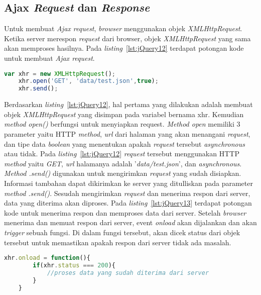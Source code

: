 \subsection{Ajax \textit{Request} dan \textit{Response}}
Untuk membuat \textit{Ajax request}, \textit{browser} menggunakan objek \textit{XMLHttpRequest}. Ketika server merespon \textit{request} dari browser, objek \textit{XMLHttpRequest} yang sama akan memproses hasilnya. Pada \textit{listing}~\ref{lst:jQuery12} terdapat potongan kode untuk membuat \textit{Ajax request}. 

\begin{lstlisting}[language=Javascript, caption=Membuat \textit{Ajax request} , label={lst:jQuery12}]
	var xhr = new XMLHttpRequest();
	xhr.open('GET', 'data/test.json',true);
	xhr.send();
\end{lstlisting}

Berdasarkan \textit{listing}~\ref{lst:jQuery12}, hal pertama yang dilakukan adalah membuat objek \textit{XMLHttpRequest} yang disimpan pada variabel bernama xhr. Kemudian \textit{method open()} berfungsi untuk menyiapkan request. \textit{Method open} memiliki 3 parameter yaitu HTTP \textit{method}, \textit{url} dari halaman yang akan menangani \textit{request}, dan tipe data \textit{boolean} yang menentukan apakah \textit{request} tersebut \textit{asynchronous} atau tidak. Pada \textit{listing}~\ref{lst:jQuery12} \textit{request} tersebut menggunakan HTTP \textit{method} yaitu \textit{GET}, \textit{url} halamanya adalah '\textit{data/test.json}', dan \textit{asynchronous}. \textit{Method .send()} digunakan untuk mengirimkan \textit{request} yang sudah disiapkan. Informasi tambahan dapat dikirimkan ke server yang ditulliskan pada parameter \textit{method .send()}. Sesudah mengirimkan \textit{request} dan menerima respon dari server, data yang diterima akan diproses. Pada \textit{listing}~\ref{lst:jQuery13} terdapat potongan kode untuk menerima respon dan memproses data dari server. Setelah \textit{browser} menerima dan memuat respon dari server, event \textit{onload} akan dijalankan dan akan \textit{trigger} sebuah fungsi. Di dalam fungsi tersebut, akan dicek status dari objek tersebut untuk memastikan apakah respon dari server tidak ada masalah. 

\begin{lstlisting}[language=Javascript, caption=Memproses respon yang didapat dari server, label={lst:jQuery13}]
	xhr.onload = function(){
		if(xhr.status === 200){
			//proses data yang sudah diterima dari server
		}
	}
\end{lstlisting}

